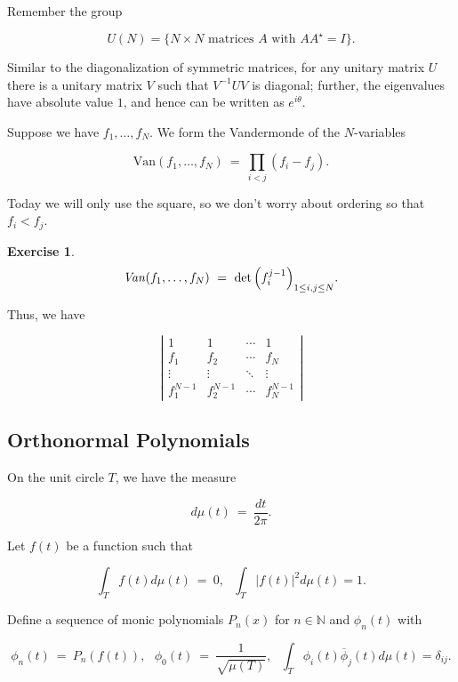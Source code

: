 \documentclass[12pt,letterpaper]{report}
\newcommand\be{\begin{equation}}
\newcommand\ee{\end{equation}}
\newcommand{\N}{\mathbb{N}}
\newtheorem{exe}[thm]{Exercise}
\begin{document}
Remember the group

\be U(N) = \{\text{$N \times N$ matrices $A$ with $A A^{\star} =
I$}\}. \ee

Similar to the diagonalization of symmetric matrices, for any
unitary matrix $U$ there is a unitary matrix $V$ such that $V^{-1}
U V$ is diagonal; further, the eigenvalues have absolute value
$1$, and hence can be written as $e^{i \theta}$.

Suppose we have $f_1, \dots, f_N$. We form the Vandermonde of the
$N$-variables

\be \text{Van}(f_1,\dots,f_N) \ = \ \prod_{i < j} (f_i - f_j). \ee

Today we will only use the square, so we don't worry about
ordering so that $f_i < f_j$.

\begin{exe}

\be \text{\emph{Van}}(f_1,\dots,f_N) \ = \ \det \Big( f_i^{j-1}
\Big)_{1 \le  i,j \le N}. \ee
\end{exe}

Thus, we have

\be \left|\begin{array}{cccc}
                        1 & 1 & \cdots & 1 \\
                        f_1 & f_2 & \cdots  & f_N \\
                        \vdots & \vdots &  \ddots & \vdots  \\
                        f_1^{N-1} & f_2^{N-1}  & \cdots  &
                        f_N^{N-1}
                          \end{array}\right|
\ee

\subsection{Orthonormal Polynomials}

On the unit circle $T$, we have the measure

\be  d\mu(t) \ = \ \frac{dt}{2\pi}. \ee

Let $f(t)$ be a function such that

\be \int_T f(t) d\mu(t) \ = \ 0, \ \ \ \int_T |f(t)|^2 d\mu(t) =
1. \ee

Define a sequence of monic polynomials $P_n(x)$ for $n \in \N$ and
$\phi_n(t)$ with

\be \phi_n(t) \ = \ P_n( f(t) ), \ \ \ \phi_0(t) \ = \
\frac{1}{\sqrt{\mu(T)}}, \ \ \ \int_T \phi_i(t)
\overline{\phi}_j(t) d\mu(t) = \delta_{ij}. \ee
\end{document}
